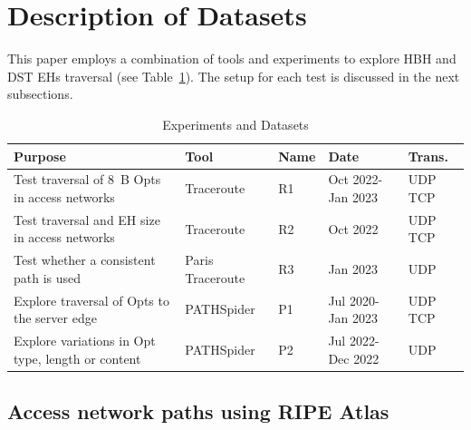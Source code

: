 \documentclass[conference]{IEEEtran}
\begin{document}





\section{Description of Datasets} 
\label{sec:methodology}

This paper employs a combination of tools and experiments to explore HBH and
DST EHs traversal (see Table~\ref{tbl:datasets}). The setup for each test is
discussed in the next subsections.

\begin{table}
\caption{Experiments and Datasets}
\begin{tabular}{p{}|p{}|p{}|p{}|p{}}
Purpose                                                                          & Tool         & Name & Date               & Trans. \\
\hline
\hline
Test traversal of 8~B Opts in access networks             & Traceroute       & R1           & Oct 2022- Jan 2023 & UDP TCP          \\
\hline
Test traversal and EH size in access networks           & Traceroute       & R2           & Oct 2022           & UDP TCP          \\
\hline
Test whether a consistent path is used 			& Paris Traceroute & R3           & Jan 2023           & UDP               \\
\hline
Explore traversal of Opts to the server edge              & PATHSpider       & P1           & Jul 2020- Jan 2023 & UDP TCP          \\
\hline
Explore variations in Opt type, length or content        & PATHSpider       & P2           & Jul 2022- Dec 2022     & UDP              
\end{tabular}
  \label{tbl:datasets}
\end{table}
    
\subsection{Access network paths using RIPE Atlas}
\label{sec:ripe-methodology}
\end{document}
